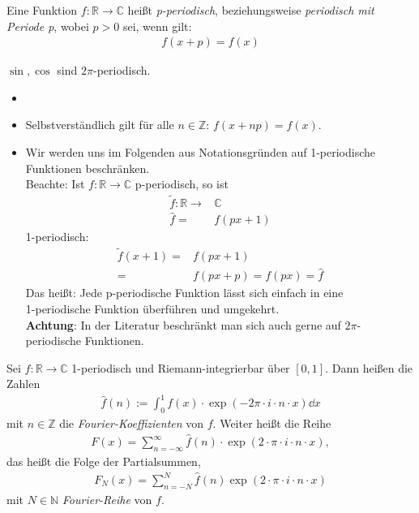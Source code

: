 \begin{Definition}{
	Eine Funktion $f: \mathbb{R} \rightarrow \mathbb{C}$ heißt \emph{p-periodisch}, 
	beziehungsweise \emph{periodisch mit Periode p}, wobei $p > 0$ sei, wenn gilt:
	\begin{align*}
		f(x+p) = f(x)
	\end{align*}
}\end{Definition}

\begin{Beispiel}{
	$\sin, \cos$ sind $2\pi$-periodisch.
}\end{Beispiel}

\begin{Bemerkung}{
\begin{itemize}
	\item[ ]
	\item Selbstverständlich gilt für alle $n \in \mathbb{Z}$: $f(x + np) = f(x)$.
	\item Wir werden uns im Folgenden aus Notationsgründen auf 1-periodische 
	Funktionen beschränken. \\
	Beachte: Ist $f: \mathbb{R} \rightarrow \mathbb{C}$ p-periodisch, so ist 
	\begin{align*}
		\tilde{f}: \mathbb{R} \rightarrow & \mathbb{C}\\
		 \hat{f} = & f(px +1)
	\end{align*}
	1-periodisch: 
	\begin{align*}
		\tilde{f}(x+1) = & f(px + 1) \\ = & f(px + p) = f(px) = \hat{f}
	\end{align*}
	Das heißt: Jede p-periodische Funktion lässt sich einfach in eine \\
	1-periodische 
	Funktion überführen und umgekehrt. \\
	\textbf{Achtung}: In der Literatur beschränkt man sich auch gerne auf $2\pi$-
	periodische Funktionen.
\end{itemize}
}\end{Bemerkung}

\begin{Definition}{\label{vl_18_def_4}
	Sei $f: \mathbb{R} \rightarrow \mathbb{C}$ 1-periodisch und Riemann-integrierbar 
	über $[0,1]$. Dann heißen die Zahlen
	\begin{align*}
		\hat{f}(n) := \int_0^1 f(x) \cdot \exp(-2\pi \cdot i \cdot n \cdot x) \dd{x}
	\end{align*}
	mit $n \in \mathbb{Z}$ die \emph{Fourier-Koeffizienten} von $f$. Weiter 
	heißt die Reihe 
	\begin{align*}
		F(x) = \sum_{n = -\infty}^{\infty} \hat{f}(n) \cdot \exp\left( 
		2 \cdot \pi \cdot i \cdot n \cdot x\right),
	\end{align*}
	das heißt die Folge der Partialsummen,
	\begin{align*}
		F_N(x)= \sum_{n = -N}^N \hat{f}(n) \exp\left( 
		2 \cdot \pi \cdot i \cdot n \cdot x\right)
	\end{align*}
	mit $N \in \mathbb{N}$ \emph{Fourier-Reihe} von $f$.
}\end{Definition}

